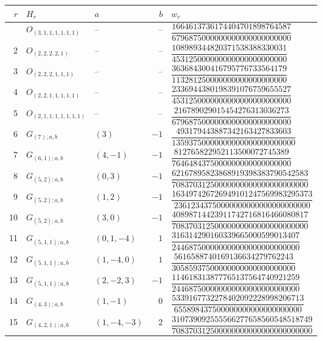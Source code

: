 \documentclass[11pt]{article}
\begin{document}
\begingroup
\small
\renewcommand{\arraystretch}{1.5}
\begin{longtable}{@{}rllrl@{}}
\toprule
$r$ & $H_r$ & $a$ & $b$ & $w_r$ \\
\midrule
\endhead
\bottomrule
\endlastfoot
1 & \(O_{(3,1,1,1,1,1,1)}\) & -- & -- & \(\dfrac{1664613736174404701898764587}{6796875000000000000000000000}\) \\[6pt]
2 & \(O_{(2,2,2,2,1)}\) & -- & -- & \(\dfrac{108989344820371538388330031}{453125000000000000000000000}\) \\[6pt]
3 & \(O_{(2,2,2,1,1,1)}\) & -- & -- & \(\dfrac{363684300416795776733564179}{113281250000000000000000000}\) \\[6pt]
4 & \(O_{(2,2,1,1,1,1,1)}\) & -- & -- & \(\dfrac{2336944380198391076759655527}{4531250000000000000000000000}\) \\[6pt]
5 & \(O_{(2,1,1,1,1,1,1,1)}\) & -- & -- & \(\dfrac{216789029015454276313036273}{6796875000000000000000000000}\) \\[6pt]
6 & \(G_{(7);a,b}\) & \((3)\) & \(-1\) & \(\dfrac{493179443887342163427833603}{13593750000000000000000000000}\) \\[6pt]
7 & \(G_{(6,1);a,b}\) & \((4,-1)\) & \(-1\) & \(\dfrac{812765822952113500072745389}{7646484375000000000000000000}\) \\[6pt]
8 & \(G_{(5,2);a,b}\) & \((0,3)\) & \(-1\) & \(\dfrac{62167895823868919398383790542583}{70837031250000000000000000000000}\) \\[6pt]
9 & \(G_{(5,2);a,b}\) & \((1,2)\) & \(-1\) & \(\dfrac{163497426726949101247569983295373}{23612343750000000000000000000000}\) \\[6pt]
10 & \(G_{(5,2);a,b}\) & \((3,0)\) & \(-1\) & \(\dfrac{40898714423911742716816466080817}{70837031250000000000000000000000}\) \\[6pt]
11 & \(G_{(5,1,1);a,b}\) & \((0,1,-4)\) & \(1\) & \(\dfrac{316314290160339665000599013407}{244687500000000000000000000000}\) \\[6pt]
12 & \(G_{(5,1,1);a,b}\) & \((1,-4,0)\) & \(1\) & \(\dfrac{5616588740169136634279762243}{30585937500000000000000000000}\) \\[6pt]
13 & \(G_{(5,1,1);a,b}\) & \((2,-2,3)\) & \(-1\) & \(\dfrac{114618313877765137564740921259}{244687500000000000000000000000}\) \\[6pt]
14 & \(G_{(4,3);a,b}\) & \((1,-1)\) & \(0\) & \(\dfrac{5339167732278402092228998206713}{655898437500000000000000000000}\) \\[6pt]
15 & \(G_{(4,2,1);a,b}\) & \((1,-4,-3)\) & \(2\) & \(\dfrac{310739092555566277658560548518749}{708370312500000000000000000000000}\) \\[6pt]

\end{longtable}
\end{document}
